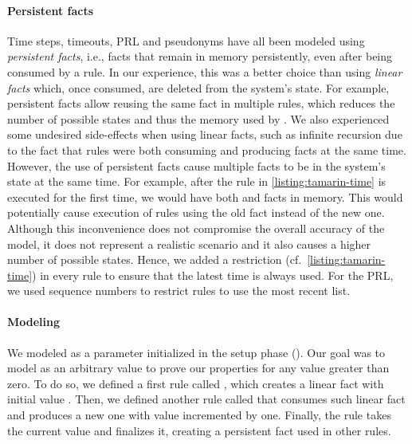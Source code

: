 \paragraph{Persistent facts}
%
Time steps, timeouts, \ac{PRL} and pseudonyms have all been modeled using
\emph{persistent facts}, i.e., facts that remain in memory persistently, even
after being consumed by a rule. In our experience, this was a better choice than
using \emph{linear facts} which, once consumed, are deleted from the system's
state. For example, persistent facts allow reusing the same 
fact in multiple rules, which reduces the number of possible states and thus the
memory used by \tamarin. We also experienced some undesired side-effects when
using linear facts, such as infinite recursion due to the fact that rules were
both consuming and producing  facts at the same time. However,
the use of persistent facts cause multiple  facts to be in the
system's state at the same time. For example, after the rule
 in \cref{listing:tamarin-time} is executed for the first
time, we would have both  and  facts
in memory. This would potentially cause execution of rules using the old
 fact instead of the new one. Although this inconvenience does
not compromise the overall accuracy of the model, it does not represent a
realistic scenario and it also causes a higher number of possible states. Hence,
we added a restriction 
(cf.~\cref{listing:tamarin-time}) in every rule to ensure that the latest time
is always used. For the \ac{PRL}, we used sequence numbers to restrict rules to
use the most recent list.

\paragraph{Modeling \paramtt{}}
%
We modeled \paramtt{} as a parameter initialized in the setup phase
(). Our goal was to model \paramtt{} as an arbitrary value to
prove our properties for any value greater than zero. To do so, we defined a
first rule called , which creates a linear fact
 with initial value . Then, we defined another rule
called  that consumes such linear fact and produces a new
one with value incremented by one. Finally, the  rule takes the
current value and finalizes it, creating a persistent fact 
used in other rules.

